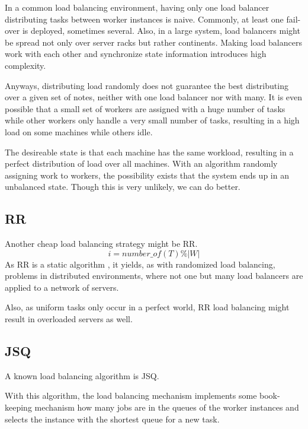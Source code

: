 In a common load balancing environment, having only one load balancer
distributing tasks between worker instances is naive.
Commonly, at least one fail-over is deployed, sometimes several.
Also, in a large system, load balancers might be spread not only over server
racks but rather continents.
Making load balancers work with each other and synchronize state information
introduces high complexity.

Anyways, distributing load randomly does not guarantee the best distributing
over a given set of notes, neither with one load balancer nor with many.
It is even possible that a small set of workers are assigned
with a huge number of tasks while other workers only handle a very small number
of tasks, resulting in a high load on some machines while others idle.

The desireable state is that each machine has the same workload, resulting in a
perfect distribution of load over all machines.
With an algorithm randomly assigning work to workers, the possibility exists
that the system ends up in an unbalanced state.
Though this is very unlikely, we can do better.

\subsection{\ac{RR}}

Another cheap load balancing strategy might be \ac{RR}.
\begin{equation}
    i = number\_of(T) \% |W|
\end{equation}
As \ac{RR} is a static algorithm \cite{availabilityLBinCC},
it yields, as with randomized load balancing, problems in distributed
environments, where not one but many load balancers are applied to a network of
servers.

Also, as uniform tasks only occur in a perfect world, \ac{RR} load balancing
might result in overloaded servers as well.

\subsection{\ac{JSQ}}

A known load balancing algorithm is \ac{JSQ}.

With this algorithm, the load balancing mechanism implements some book-keeping
mechanism how many jobs are in the queues of the worker instances and selects
the instance with the shortest queue for a new task.


